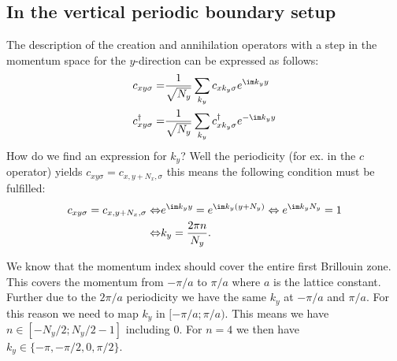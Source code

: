 \documentclass[../main.tex]{subfile}
\begin{document}
\subsection{In the vertical periodic boundary setup}
The description of the creation and annihilation operators with a step in the momentum space for the $y$-direction can be expressed as follows:
\begin{align}
    c_{xy\sigma} =& \frac{1}{\sqrt{N_y}} \sum_{k_y} c_{x k_y\sigma} e^{\im k_y y} \label{eq:C_Foruier}\\
    c^{\dagger}_{xy\sigma} =& \frac{1}{\sqrt{N_y}} \sum_{k_y} c^{\dagger}_{x k_y\sigma} e^{-\im k_y y}\label{eq:C_dagg_Foruier}
\end{align}
How do we find an expression for $k_y$? Well the periodicity (for ex. in the $c$ operator) yields 
$c_{xy\sigma} = c_{x,y+N_x,\sigma}$ this means the following condition must be fulfilled:
\begin{align*}
    c_{xy\sigma} = c_{x,y+N_x,\sigma} \Leftrightarrow &e^{\im k_y y} = e^{\im k_y (y+N_y)} \Leftrightarrow e^{\im k_y N_y} = 1\\
    \Leftrightarrow &k_y = \frac{2\pi n}{N_y}.
\end{align*}

We know that the momentum index should cover the entire first Brillouin zone. This covers the momentum from $-\pi/a$ to $\pi/a$ 
where $a$ is the lattice constant. Further due to the $2\pi/a$ periodicity we have the same $k_y$ at $-\pi/a$ and $\pi/a$.
For this reason we need to map $k_y $ in $[-\pi/a ;\pi/a)$.
This means we have $n\in \left[-N_y/2  ; N_y/2-1\right]$ including $0$. For $n=4$ we then have $k_y\in\{ -\pi, -\pi/2, 0,  \pi/2\}$. \\
\end{document}
